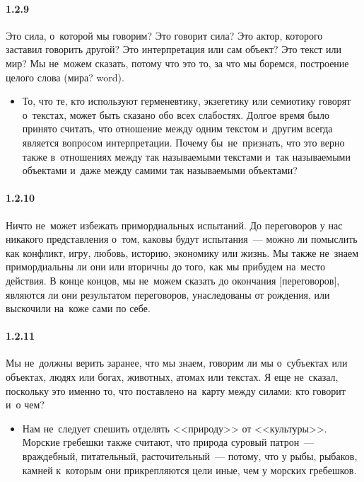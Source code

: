 \paragraph{1.2.9}\hypertarget{par:1.2.9}{} Это сила, о~которой мы говорим? Это говорит сила? Это актор, которого заставил говорить другой? Это интерпретация или сам объект? Это текст или мир? Мы не~можем сказать, потому что это то, за что мы боремся, построение целого слова (мира? word).
	\begin{itemize}
	\item То, что те, кто используют герменевтику, экзегетику или семиотику говорят о~текстах, может быть сказано обо всех слабостях. Долгое время было принято считать, что отношение между одним текстом и~другим всегда является вопросом интерпретации. Почему бы~не~признать, что это верно также в~отношениях между так называемыми текстами и~так называемыми объектами и~даже между самими так называемыми объектами?
	\end{itemize}

\paragraph{1.2.10}\hypertarget{par:1.2.10}{} Ничто не~может избежать примордиальных испытаний. До переговоров у нас никакого представления о~том, каковы будут испытания~--- можно ли помыслить как конфликт, игру, любовь, историю, экономику или жизнь. Мы также не~знаем примордиальны ли они или вторичны до того, как мы прибудем на~место действия. В конце концов, мы не~можем сказать до окончания [переговоров], являются ли они результатом переговоров, унаследованы от рождения, или выскочили на~коже сами по себе.

\paragraph{1.2.11}\hypertarget{par:1.2.11}{} Мы не~должны верить заранее, что мы знаем, говорим ли мы о~субъектах или объектах, людях или богах, животных, атомах или текстах. Я еще не~сказал, поскольку это именно то, что поставлено на~карту между силами: кто говорит и~о чем?
	\begin{itemize}
	\item Нам не~следует спешить отделять <<природу>> от <<культуры>>. Морские гребешки также считают, что природа суровый патрон~--- враждебный, питательный, расточительный~--- потому, что у рыбы, рыбаков, камней к~которым они прикрепляются цели иные, чем у морских гребешков.
	\end{itemize}

